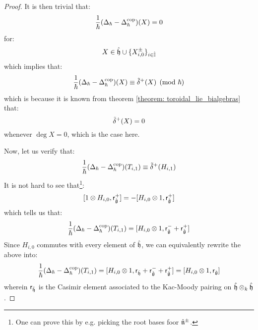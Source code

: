 \begin{proof}
                It is then trivial that:
                    $$\frac{1}{\hbar}( \Delta_{\hbar} - \Delta_{\hbar}^{\mathrm{cop}} )(X) = 0$$
                for:
                    $$X \in \hat{\mathfrak{h}} \cup \{X_{i, 0}^{\pm}\}_{i \in \hat{\mathbb{I}}}$$
                which implies that:
                    $$\frac{1}{\hbar}( \Delta_{\hbar} - \Delta_{\hbar}^{\mathrm{cop}} )(X) \equiv \tilde{\delta}^{+}(X) \pmod{\hbar}$$
                which is because it is known from theorem \ref{theorem: toroidal_lie_bialgebras} that:
                    $$\tilde{\delta}^{+}(X) = 0$$
                whenever $\deg X = 0$, which is the case here.
                
                Now, let us verify that:
                    $$\frac{1}{\hbar}(\Delta_{\hbar} - \Delta_{\hbar}^{\mathrm{cop}})(T_{i, 1}) \equiv \tilde{\delta}^{+}(H_{i, 1})$$
                It is not hard to see that\footnote{One can prove this by e.g. picking the root bases foor $\hat{\mathfrak{n}}^{\pm}$.}:
                    $$[1 \tensor H_{i, 0}, \sfr_{ \hat{\g} }^+] = -[H_{i, 0} \tensor 1, \sfr_{ \hat{\g} }^+]$$
                which tells us that:
                    $$\frac{1}{\hbar}( \Delta_{\hbar} - \Delta_{\hbar}^{\cop} )(T_{i, 1}) = [H_{i, 0} \tensor 1, \sfr_{ \hat{\g} }^- + \sfr_{ \hat{\g} }^+]$$
                Since $H_{i, 0}$ commutes with every element of $\hat{\mathfrak{h}}$, we can equivalently rewrite the above into:
                    $$\frac{1}{\hbar}( \Delta_{\hbar} - \Delta_{\hbar}^{\cop} )(T_{i, 1}) = [H_{i, 0} \tensor 1, \sfr_{\hat{\h}} + \sfr_{ \hat{\g} }^- + \sfr_{ \hat{\g} }^+] = [H_{i, 0} \tensor 1, \sfr_{ \hat{\g} }]$$
                wherein $\mathsf{r}_{\hat{\mathfrak{h}}}$ is the Casimir element associated to the Kac-Moody pairing on $\hat{\h} \tensor_k \hat{\h}$. 


\end{proof}
